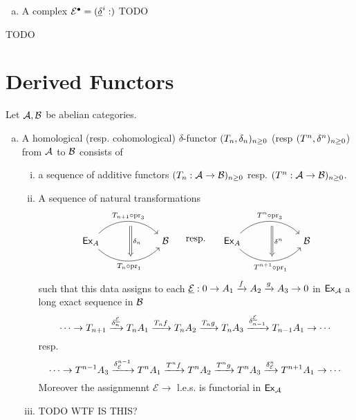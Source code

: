 \documentclass[a4paper]{report}
\begin{document}
\begin{defi}
\begin{enumerate}[(a)]
\item A complex $\mathcal E^{\bullet} = (\underline {\delta}^{i}: )$ TODO
\end{enumerate}

\end{defi}
\begin{thm}TODO

\end{thm}


\section{Derived Functors}
Let $\mathcal{A}, \mathcal{B}$ be abelian categories.
\begin{defi}
\begin{enumerate}[(a)]
  \item A homological (resp. cohomological) $\delta$-functor $(T_{n}, \delta_{n})_{n \ge 0}$ (resp $(T^{n}, \delta^{n})_{n \ge 0}$) from $\mathcal{A}$ to $\mathcal{B}$ consists of
        \begin{enumerate}[(i)]
          \item a sequence of additive functors $(T_{n}: \mathcal{A} \to \mathcal{B})_{n \ge 0}$ resp. $(T^{n}: \mathcal{A} \to \mathcal{B})_{n \ge 0}$.
                \item A sequence of natural transformations \[\begin{tikzcd}[row sep = 8]
& {} \arrow[dd, "\d_{n}", Rightarrow] &    \\
\Ex_{A} \arrow[rr, "T_{n+1} \c \pr_{3}", bend left=45] \arrow[rr, "T_{n} \c \pr_{1}"', bend right=45] &                                & \B \\
& {}                             &
\end{tikzcd} \quad \text{ resp. }\quad \begin{tikzcd}[row sep = 8]
& {} \arrow[dd, "\d^{n}", Rightarrow] &    \\
\Ex_{A} \arrow[rr, "T^{n} \c \pr_{3}", bend left=45] \arrow[rr, "T^{n+1} \c \pr_{1}"', bend right=45] &                                & \B \\
& {}                             &
\end{tikzcd}\]
                such that this data assigns to each $\underline{\mathcal E}: 0 \to A_{1} \xrightarrow f A_{2} \xrightarrow g A_{3} \to 0$ in $\mathsf{Ex}_{\mathcal{A}}$ a long exact sequence in $\mathcal{B}$
                \[\cdots \to T_{n+1} \xrightarrow{\delta_{n}^{\underline{\mathcal E}}}T_{n}A_{1} \xrightarrow {T_{n}f} T_{n}A_{2} \xrightarrow{T_{n}g} T_{n}A_{3} \xrightarrow{\delta_{n-1}^{\underline{\mathcal E}}}T_{n-1}A_{1} \to \cdots\]
                resp.
                \[\cdots \to T^{n-1}A_{3} \xrightarrow {\delta^{n-1}_{\cal E}} T^{n}A_{1} \xrightarrow{T^{n}f} T^{n}A_{2} \xrightarrow {T^{n}g} T^{n}A_{3} \xrightarrow{\delta_{\cal E}^{n}} T^{n+1}A_{1} \to \cdots\]
                Moreover the assignmennt $\mathcal E \to $ l.e.s. is functorial in $\mathsf{Ex}_{\mathcal{A}}$
                \item TODO WTF IS THIS?
        \end{enumerate}

\end{enumerate}

\end{defi}
\end{document}
